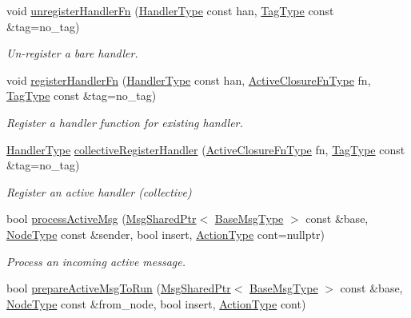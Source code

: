 \begin{DoxyCompactItemize}
void \hyperlink{structvt_1_1messaging_1_1_active_messenger_a1f3defb40c1a5700c3d6cafae09ef7c6}{unregister\+Handler\+Fn} (\hyperlink{namespacevt_af64846b57dfcaf104da3ef6967917573}{Handler\+Type} const han, \hyperlink{namespacevt_a84ab281dae04a52a4b243d6bf62d0e52}{Tag\+Type} const \&tag=no\+\_\+tag)
\begin{DoxyCompactList}\small\item\em Un-\/register a bare handler. \end{DoxyCompactList}\item 
void \hyperlink{structvt_1_1messaging_1_1_active_messenger_aec741a8dbff9585e378f32d6ef2a2163}{register\+Handler\+Fn} (\hyperlink{namespacevt_af64846b57dfcaf104da3ef6967917573}{Handler\+Type} const han, \hyperlink{namespacevt_a2a06c34cafcd511828f16cbf1476b924}{Active\+Closure\+Fn\+Type} fn, \hyperlink{namespacevt_a84ab281dae04a52a4b243d6bf62d0e52}{Tag\+Type} const \&tag=no\+\_\+tag)
\begin{DoxyCompactList}\small\item\em Register a handler function for existing handler. \end{DoxyCompactList}\item 
\hyperlink{namespacevt_af64846b57dfcaf104da3ef6967917573}{Handler\+Type} \hyperlink{structvt_1_1messaging_1_1_active_messenger_a7e693e4b292e45fc1ed0dc8c9e2c03ec}{collective\+Register\+Handler} (\hyperlink{namespacevt_a2a06c34cafcd511828f16cbf1476b924}{Active\+Closure\+Fn\+Type} fn, \hyperlink{namespacevt_a84ab281dae04a52a4b243d6bf62d0e52}{Tag\+Type} const \&tag=no\+\_\+tag)
\begin{DoxyCompactList}\small\item\em Register an active handler (collective) \end{DoxyCompactList}\item 
bool \hyperlink{structvt_1_1messaging_1_1_active_messenger_a19b097ef9bd7a2793eb47594d11d9e27}{process\+Active\+Msg} (\hyperlink{structvt_1_1messaging_1_1_msg_shared_ptr}{Msg\+Shared\+Ptr}$<$ \hyperlink{namespacevt_a44d0d4e144748f2b19a1cfd962f50338}{Base\+Msg\+Type} $>$ const \&base, \hyperlink{namespacevt_a866da9d0efc19c0a1ce79e9e492f47e2}{Node\+Type} const \&sender, bool insert, \hyperlink{namespacevt_ae0a5a7b18cc99d7b732cb4d44f46b0f3}{Action\+Type} cont=nullptr)
\begin{DoxyCompactList}\small\item\em Process an incoming active message. \end{DoxyCompactList}\item 
bool \hyperlink{structvt_1_1messaging_1_1_active_messenger_a9ee00c465953cf0df7b0f5e40bd0183b}{prepare\+Active\+Msg\+To\+Run} (\hyperlink{structvt_1_1messaging_1_1_msg_shared_ptr}{Msg\+Shared\+Ptr}$<$ \hyperlink{namespacevt_a44d0d4e144748f2b19a1cfd962f50338}{Base\+Msg\+Type} $>$ const \&base, \hyperlink{namespacevt_a866da9d0efc19c0a1ce79e9e492f47e2}{Node\+Type} const \&from\+\_\+node, bool insert, \hyperlink{namespacevt_ae0a5a7b18cc99d7b732cb4d44f46b0f3}{Action\+Type} cont)

\end{DoxyCompactItemize}
